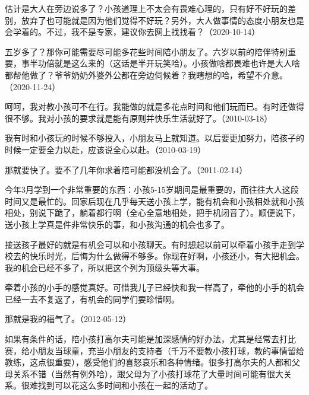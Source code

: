 
估计是大人在旁边说多了？小孩道理上不太会有畏难心理的，只有好不好玩的差别，放弃了也可能就是因为他们觉得不好玩？另外，大人做事情的态度小朋友也是会学着的。不过，我不是专家，建议你去网上找找看？（2020-10-14）


五岁多了？那你可能需要尽可能多花些时间陪小朋友了。六岁以前的陪伴特别重要，事半功倍就是这么来的（这话是半开玩笑哈）。小孩做啥都畏难也许是大人啥都帮他做了？爷爷奶奶外婆外公都在旁边伺候着？我瞎想的哈，希望不介意。（2020-11-24）

呵呵，我对教小孩可不在行。我能做的就是多花点时间和他们玩而已。有时还做得很不够。我对小孩的要求就是能有原则并快乐生活就好了。（2010-03-18）

我有时和小孩玩的时候不够投入，小朋友马上就知道。以后要更加努力，陪孩子的时候一定要全力以赴，应该说全心以赴。（2010-03-19）


那就要快了。要不了几年你求着陪可能都没机会了。（2011-02-14）

今年3月学到一个非常重要的东西：小孩5-15岁期间是最重要的，而往往大人这段时间又是最忙的。回家后现在几乎每天送小孩上学，能有机会和小孩相处就和小孩相处，别说下跪了，躺着都行啊（全心全意地相处，把手机闭音了）。顺便说下，送小孩上学真是件非常快乐的事，和小孩沟通的机会也多了。

接送孩子最好的就是有机会可以和小孩聊天。有时想起以前可以牵着小孩手走到学校去的快乐时光，后悔为什么做得不够多。你现在好啊，小孩还小，有大把机会。我的机会已经不多了，所以把这个列为顶级头等大事。

牵着小孩的小手的感觉真好。可惜我儿子已经快和我一样高了，牵他的小手的机会已经一去不复返了，有机会的同学们要珍惜啊。


那就是我的福气了。（2012-05-12）

如果有条件的话，陪小孩打高尔夫可能是加深感情的好办法，尤其是经常去打比赛，给小朋友当球童，充当小朋友的支持者（千万不要教小孩打球，教的事情留给教练，这点很重要），感受他们的喜怒哀乐和各种情绪。很多打高尔夫的人都和父母关系不错（当然有例外哈），跟父母为了小孩打球花了大量时间可能有很大关系。很难找到可以花这么多时间和小孩在一起的活动了。

